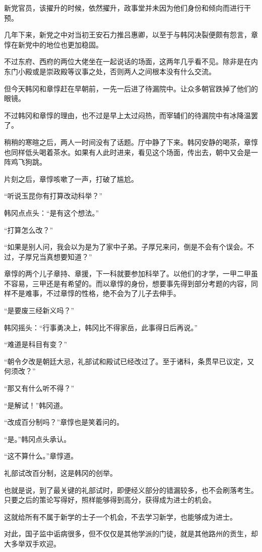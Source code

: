 新党官员，该擢升的时候，依然擢升，政事堂并未因为他们身份和倾向而进行干预。

几年下来，新党之中对当初王安石力推吕惠卿，以至于与韩冈决裂便颇有怨言，章惇在新党中的地位也更加稳固。

不过东府、西府的两位大佬坐在一起说话的场面，这两年几乎看不见。除非是在内东门小殿或是崇政殿等议事之处，否则两人之间根本没有什么交流。

但今天韩冈和章惇赶在早朝前，一先一后进了待漏院中。让众多朝官跌掉了他们的眼镜。

不过韩冈和章惇的理由，也不过是早上太过闷热，而宰辅们的待漏院中有冰降温罢了。

稍稍的寒暄之后，两人一时间没有了话题。厅中静了下来。韩冈安静的喝茶，章惇也同样低头喝着茶水。如果有人此时进来，看见这个场面，传出去，朝中又会是一阵鸡飞狗跳。

片刻之后，章惇咳嗽了一声，打破了尴尬。

“听说玉昆你有打算改动科举？”

韩冈点点头：“是有这个想法。”

“打算怎么改？”

“如果是别人问，我会以为是为了家中子弟。子厚兄来问，倒是不会有个误会。不过，子厚兄当真想要知道？”

章惇的两个儿子章持、章援，下一科就要参加科举了。以他们的才学，一甲二甲虽不容易，三甲还是有希望的。而以章惇的身份，想要事先得到部分考题的内容，同样不是难事，不过章惇的性格，绝不会为了儿子去伸手。

“是要废三经新义吗？”

韩冈摇头：“行事勇决上，韩冈比不得家岳，此事得日后再说。”

“难道是科目有变？”

“朝令夕改是朝廷大忌，礼部试和殿试已经改过了。至于诸科，条贯早已议定，又何须改？”

“那又有什么听不得？”

“是解试！”韩冈道。

“改成百分制吗？”章惇也是笑着问的。

“是。”韩冈点头承认。

“这不算什么。”章惇道。

礼部试改百分制，这是韩冈的创举。

也就是说，到了最关键的礼部试时，即便经义部分的错漏较多，也不会刷落考生。只要之后的策论写得好，照样能够得到高分，获得成为进士的机会。

这就给所有不属于新学的士子一个机会，不去学习新学，也能够成为进士。

对此，国子监中诟病很多，但不仅仅是其他学派的门徒，就是其他路州的贡生，却大多举双手欢迎。

